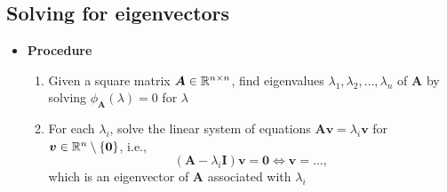 \documentclass[12pt,a4paper]{article}
\begin{document}
\subsection{Solving for eigenvectors}

\begin{itemize}

\item \textbf{Procedure}
  \begin{enumerate}
  \item Given a square matrix $\bm{A}\in \mathbb{R}^{n\times n}$,
    find eigenvalues $\lambda_{1},\lambda_{2},\ldots, \lambda_{n}$
    of $\bm{A}$
    by solving $\phi_{\bm{A}}(\lambda)=0$ for $\lambda$
  \item For each $\lambda_{i}$,
    solve the linear system of equations $\bm{A}\bm{v} = \lambda_{i}\bm{v}$
    for $\bm{v}\in\mathbb{R}^{n}\setminus\{\bm{0}\}$,
    i.e.,
    \begin{equation}\nonumber%
      \left(\bm{A} - \lambda_{i}\bm{I}\right)\bm{v} = \bm{0}
      \iff
      \bm{v} = \ldots,
    \end{equation}
    which is an eigenvector of $\bm{A}$ associated with $\lambda_{i}$
  \end{enumerate}


\end{itemize}
\end{document}
